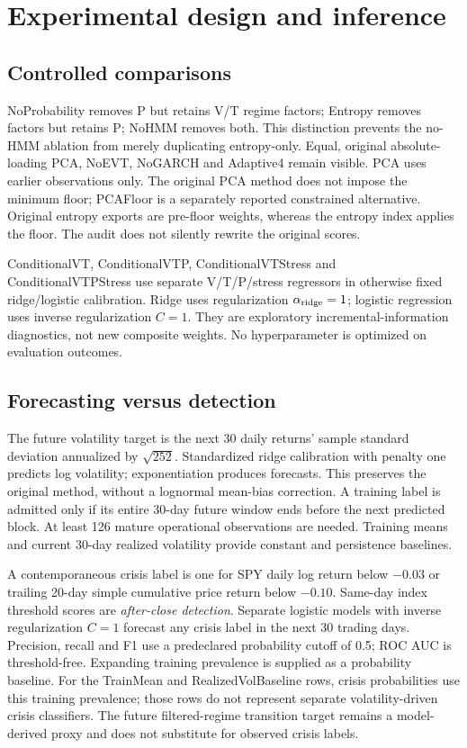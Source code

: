 \documentclass[11pt]{article}
\begin{document}
\section{Experimental design and inference}
\subsection{Controlled comparisons}
NoProbability removes P but retains V/T regime factors; Entropy removes factors but retains P;
NoHMM removes both. This distinction prevents the no-HMM ablation from merely duplicating entropy-only.
Equal, original absolute-loading PCA, NoEVT, NoGARCH and Adaptive4 remain visible. PCA uses earlier
observations only. The original PCA method does not impose the minimum floor; PCAFloor is a separately
reported constrained alternative. Original entropy exports are pre-floor weights, whereas the entropy
index applies the floor. The audit does not silently rewrite the original scores.

Conditional\-VT, Conditional\-VTP, Conditional\-VT\-Stress and Conditional\-VTP\-Stress use separate V/T/P/stress
regressors in otherwise fixed ridge/logistic calibration. Ridge uses regularization $\alpha_{\rm ridge}=1$;
logistic regression uses inverse regularization $C=1$. They are exploratory incremental-information
diagnostics, not new composite weights. No hyperparameter is optimized on evaluation outcomes.

\subsection{Forecasting versus detection}
The future volatility target is the next 30 daily returns' sample standard deviation annualized by
$\sqrt{252}$. Standardized ridge calibration with penalty one predicts log volatility; exponentiation
produces forecasts. This preserves the original method, without a lognormal mean-bias correction.
A training label is admitted only if its entire 30-day future window ends before the next predicted
block. At least 126 mature operational observations are needed. Training means and current 30-day
realized volatility provide constant and persistence baselines.

A contemporaneous crisis label is one for SPY daily log return below $-0.03$ or trailing 20-day
simple cumulative price return below $-0.10$. Same-day index threshold scores are \emph{after-close detection}. Separate
logistic models with inverse regularization $C=1$ forecast any crisis label in the next 30 trading days. Precision,
recall and F1 use a predeclared probability cutoff of 0.5; ROC AUC is threshold-free. Expanding
training prevalence is supplied as a probability baseline.
For the TrainMean and RealizedVolBaseline rows, crisis probabilities use this training prevalence;
those rows do not represent separate volatility-driven crisis classifiers. The future filtered-regime transition
target remains a model-derived proxy and does not substitute for observed crisis labels.
\end{document}
